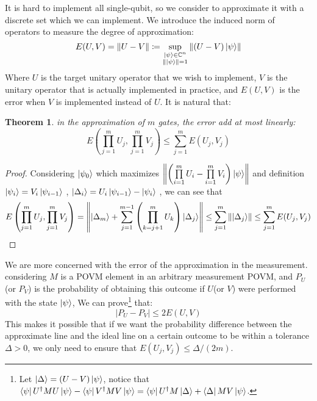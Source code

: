 \documentclass[a4paper,10pt]{article}
\newtheorem{theorem}{Theorem}[subsection]
\numberwithin{equation}{subsection}
\begin{document}
It is hard to implement all single-qubit, so we consider to approximate it with a discrete set which we can implement. We introduce the induced norm of operators to measure the degree of approximation:
\begin{equation}
    E(U,V) = \left\| U-V \right\| \coloneqq \sup\limits_{\substack{\ket{\psi} \in \mathbb{C}^{n} \\ \left\| \ket{\psi} \right\| = 1}} \left\| (U-V)\ket{\psi} \right\|
\end{equation}
Where $U$ is the target unitary operator
that we wish to implement, $V$ is the unitary operator that is actually implemented in practice, and $E(U,V)$ is the error when $V$ is implemented instead of $U$. It is natural that:
\begin{theorem}
    in the approximation of $m$ gates, the error add at most linearly:
    \begin{equation}
        E\left(\prod\limits_{j=1}^{m}U_{j},\prod\limits_{j=1}^{m}V_{j}\right) \leq \sum_{j=1}^{m} E(U_{j},V_{j})
    \end{equation}
\end{theorem}
\begin{proof}
    Considering $\ket{\psi_{0}}$ which maximizes $\left\|\left(\prod\limits_{i=1}^{m}U_{i} -  \prod\limits_{i=1}^{m}V_{i}\right)\ket{\psi}\right\|$ and definition $\ket{\psi_{i}} = V_{i}\ket{\psi_{i-1}}$ , $\ket{\Delta_{i}} = U_{i}\ket{\psi_{i-1}} - \ket{\psi_{i}}$ , we can see that
    \begin{equation}
        E\left(\prod\limits_{j=1}^{m}U_{j},\prod\limits_{j=1}^{m}V_{j}\right) = \left\|\ket{\Delta_{m}} + \sum\limits_{j=1}^{m-1} \left(\prod_{k=j+1}^{m}U_{k}\right)\ket{\Delta_{j}}\right\| \leq \sum\limits_{j=1}^{m} \left\|\ket{\Delta_{j}}\right\| \leq \sum_{j=1}^{m} E(U_{j},V_{j})
    \end{equation}
\end{proof}


We are more concerned with the error of the approximation in the measurement. considering $M$ is a POVM element in an arbitrary measurement POVM, and $P_{U}$(or $P_{V}$) is the probability of obtaining this outcome if $U$(or $V$) were performed with the state $\ket{\psi}$, We can prove\footnote{Let $\ket{\Delta} = (U-V)\ket{\psi}$, notice that $\bra{\psi}U^{\dagger}MU\ket{\psi} - \bra{\psi}V^{\dagger}MV\ket{\psi} = \bra{\psi}U^{\dagger}M\ket{\Delta} + \bra{\Delta}MV\ket{\psi}$. } that:
\begin{equation}
    \left| P_{U} - P_{V} \right| \leq 2E(U,V)
\end{equation}
This makes it possible that if we want the probability difference between the approximate line and the ideal line on a certain outcome to be within a tolerance $\Delta > 0$, we only need to ensure that $E(U_{j},V_{j}) \leq \Delta/(2m)$.
\end{document}
